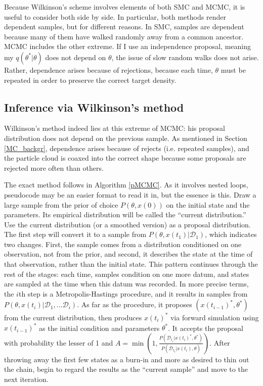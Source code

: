 \documentclass{article}
\begin{document}
Because Wilkinson's scheme involves elements of both SMC and MCMC, it is useful to consider both side by side. In particular, both methods render dependent samples, but for different reasons. In SMC, samples are dependent because many of them have walked randomly away from a common ancestor. MCMC includes the other extreme. If I use an independence proposal, meaning my $q(\theta^*|\theta)$ does not depend on $\theta$, the issue of slow random walks does not arise. Rather, dependence arises because of rejections, because each time, $\theta$ must be repeated in order to preserve the correct target density.

\subsection{Inference via Wilkinson's method}
\label{sec:wilk_algo}
Wilkinson's method indeed lies at this extreme of MCMC: his proposal distribution does not depend on the previous sample. As mentioned in Section \ref{MC_backgr}, dependence arises because of rejects (i.e. repeated samples), and the particle cloud is coaxed into the correct shape because some proposals are rejected more often than others. 

The exact method follows in Algorithm \ref{pMCMC}. As it involves nested loops, pseudocode may be an easier format to read it in, but the essence is this. Draw a large sample from the prior of choice $P(\theta, x(0))$ on the initial state and the parameters. Its empirical distribution will be called the ``current distribution.'' Use the current distribution (or a smoothed version) as a proposal distribution. The first step will convert it to a sample from $P(\theta, x(t_1)|\mathcal{D}_1)$, which indicates two changes. First, the sample comes from a distribution conditioned on one observation, not from the prior, and second, it describes the state at the time of that observation, rather than the initial state. This pattern continues through the rest of the stages: each time, samples condition on one more datum, and states are sampled at the time when this datum was recorded. In more precise terms, the $i$th step is a Metropolis-Hastings procedure, and it results in samples from $P(\theta, x(t_i)|\mathcal{D}_{1}, ...\mathcal{D}_{i})$. As far as the procedure, it proposes $(x(t_{i-1})^*, \theta^*)$ from the current distribution, then produces $x(t_{i})^*$ via forward simulation using $x(t_{i-1})^*$ as the initial condition and parameters $\theta^*$. It accepts the proposal with probability the lesser of 1 and $A=\min(1, \frac{P(\mathcal{D}_{t_{i}}|x(t_{i})^*, \theta^*)}{P(\mathcal{D}_{t_{i}}|x(t_{i}), \theta)})$. 
After throwing away the first few states as a burn-in and more as desired to thin out the chain, begin to regard the results as the ``current sample'' and move to the next iteration. 
\end{document}
